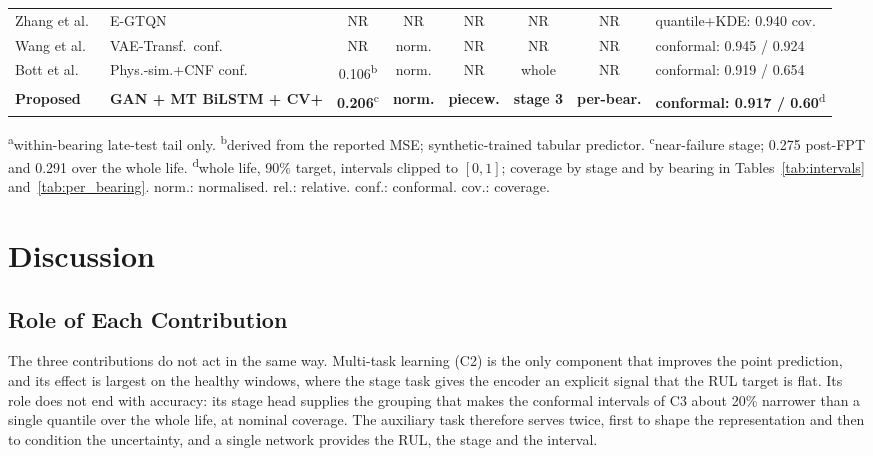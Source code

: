 \documentclass[review]{elsarticle}
\begin{document}
\begin{table}[!htbp]
\begin{tabular}{llcccccl}
Zhang et al.~\cite{zhang_explainable_2025}     & E-GTQN      & NR & NR & NR & NR & NR & quantile+KDE: 0.940 cov. \\
Wang et al.~\cite{wang_uncertainty-aware_2026} & VAE-Transf.\ conf. & NR & norm. & NR & NR & NR & conformal: 0.945 / 0.924 \\
Bott et al.~\cite{11373138}          & Phys.-sim.+CNF conf. & 0.106\textsuperscript{b} & norm. & NR & whole & NR & conformal: 0.919 / 0.654 \\
\midrule
\rowcolor[RGB]{198,224,180}
\textbf{Proposed} & \textbf{GAN + MT BiLSTM + CV+} &
\textbf{0.206}\textsuperscript{c} & \textbf{norm.} & \textbf{piecew.} &
\textbf{stage 3} & \textbf{per-bear.} & \textbf{conformal: 0.917 / 0.60}\textsuperscript{d} \\
\bottomrule
\end{tabular}

\vspace{3pt}
\raggedright\scriptsize
\textsuperscript{a}within-bearing late-test tail only.
\textsuperscript{b}derived from the reported MSE; synthetic-trained tabular predictor.
\textsuperscript{c}near-failure stage; 0.275 post-FPT and 0.291 over the whole life.
\textsuperscript{d}whole life, 90\% target, intervals clipped to $[0,1]$; coverage by stage and by bearing in Tables~\ref{tab:intervals} and~\ref{tab:per_bearing}.
norm.: normalised. rel.: relative. conf.: conformal. cov.: coverage.
\end{table}


\section{Discussion}
\label{sec:discussion}

\subsection{Role of Each Contribution}

The three contributions do not act in the same way. Multi-task learning
(C2) is the only component that improves the point prediction, and its
effect is largest on the healthy windows, where the stage task gives
the encoder an explicit signal that the RUL target is flat. Its role
does not end with accuracy: its stage head supplies the grouping that
makes the conformal intervals of C3 about 20\% narrower than a single
quantile over the whole life, at nominal coverage. The auxiliary task
therefore serves twice, first to shape the representation and then to
condition the uncertainty, and a single network provides the RUL, the
stage and the interval.\\
\end{document}
